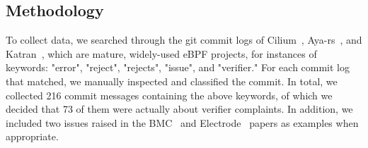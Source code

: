 
\subsection{Methodology}
To collect data, we searched through the git commit logs of Cilium~\cite{cilium}, Aya-rs~\cite{aya-rs}, and
    Katran~\cite{katran}, which are mature, widely-used eBPF projects, for instances of
    keywords: "error", "reject", "rejects", "issue", and "verifier."
For each commit log that matched, we manually inspected and classified the commit.
In total, we collected 216 commit messages containing the above keywords, of which we decided that 73 of them were actually about verifier complaints.
In addition, we included two issues raised in the BMC~\cite{BMC} and Electrode~\cite{Electrode} papers as examples when appropriate.




